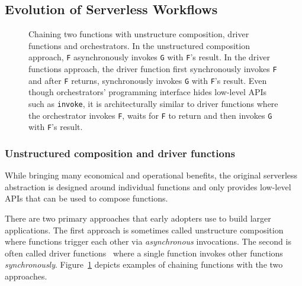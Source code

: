 \subsection{Evolution of Serverless Workflows}

\begin{figure}[t!]
    \centering
    \caption{Chaining two functions with unstructure composition, driver
    functions and orchestrators. In the unstructured composition approach,
	\texttt{F} asynchronously invokes \texttt{G} with \texttt{F}'s result. In
	the driver functions approach, the driver function first synchronously
	invokes \texttt{F} and after \texttt{F} returns, synchronously invokes
	\texttt{G} with \texttt{F}'s result. Even though orchestrators'
	programming interface hides low-level APIs such as \texttt{invoke}, it is
	architecturally similar to driver functions where the orchestrator invokes
	\texttt{F}, waits for \texttt{F} to return and then invokes \texttt{G}
	with \texttt{F}'s result.}
    \label{fig:chain-example}
\end{figure}

\subsubsection{Unstructured composition and driver functions}
While bringing many economical and operational benefits, the original
serverless abstraction is designed around individual functions and only
provides low-level APIs that can be used to compose functions.

There are two primary approaches that early adopters use to build larger
applications. The first approach is sometimes called unstructure
composition~\cite{netherite} where functions trigger each other via
\emph{asynchronous} invocations. The second is often called driver
functions~\cite{beldi} where a single function invokes other functions
\emph{synchronously}. Figure~\ref{fig:chain-example} depicts examples of
chaining functions with the two approaches.


